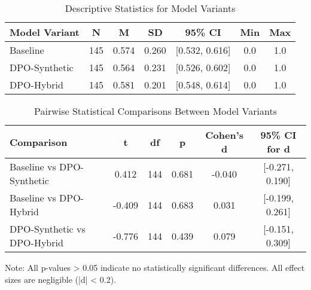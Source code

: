 

\begin{table}[htbp]
\centering
\caption{Descriptive Statistics for Model Variants}
\label{tab:descriptive-statistics}
\begin{tabular}{lcccccc}
\toprule
\textbf{Model Variant} & \textbf{N} & \textbf{M} & \textbf{SD} & \textbf{95\% CI} & \textbf{Min} & \textbf{Max} \\
\midrule
Baseline           & 145 & 0.574 & 0.260 & [0.532, 0.616] & 0.0 & 1.0 \\
DPO-Synthetic      & 145 & 0.564 & 0.231 & [0.526, 0.602] & 0.0 & 1.0 \\
DPO-Hybrid         & 145 & 0.581 & 0.201 & [0.548, 0.614] & 0.0 & 1.0 \\
\bottomrule
\end{tabular}
\end{table}



\begin{table}[htbp]
\centering
\caption{Pairwise Statistical Comparisons Between Model Variants}
\label{tab:statistical-comparisons}
\begin{tabular}{lccccc}
\toprule
\textbf{Comparison} & \textbf{t} & \textbf{df} & \textbf{p} & \textbf{Cohen's d} & \textbf{95\% CI for d} \\
\midrule
Baseline vs DPO-Synthetic    & 0.412 & 144 & 0.681 & -0.040 & [-0.271, 0.190] \\
Baseline vs DPO-Hybrid       & -0.409 & 144 & 0.683 & 0.031 & [-0.199, 0.261] \\
DPO-Synthetic vs DPO-Hybrid  & -0.776 & 144 & 0.439 & 0.079 & [-0.151, 0.309] \\
\bottomrule
\end{tabular}
\begin{tablenotes}
\small
\item Note: All p-values > 0.05 indicate no statistically significant differences. All effect sizes are negligible (|d| < 0.2).
\end{tablenotes}
\end{table}




